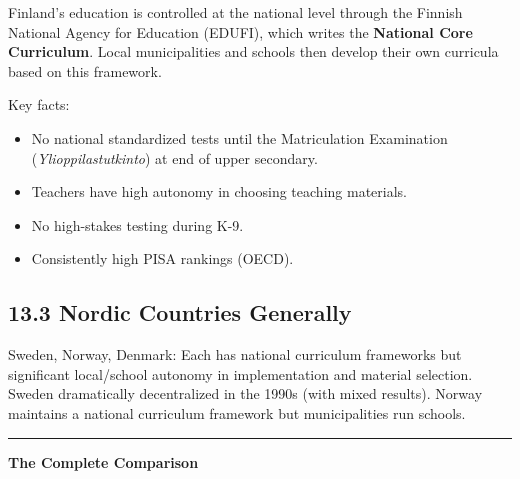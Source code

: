	Finland's education is controlled at the national level through the Finnish National Agency for Education (EDUFI), which writes the \textbf{National Core Curriculum}. Local municipalities and schools then develop their own curricula based on this framework.

	Key facts:
	\begin{itemize}
		\item No national standardized tests until the Matriculation Examination (\textit{Ylioppilastutkinto}) at end of upper secondary.
		\item Teachers have high autonomy in choosing teaching materials.
		\item No high-stakes testing during K-9.
		\item Consistently high PISA rankings (OECD).
	\end{itemize}

	\subsection{13.3 Nordic Countries Generally}

	Sweden, Norway, Denmark: Each has national curriculum frameworks but significant local/school autonomy in implementation and material selection. Sweden dramatically decentralized in the 1990s (with mixed results). Norway maintains a national curriculum framework but municipalities run schools.


\vspace{1em}
\noindent\textcolor{Rule}{\rule{\linewidth}{0.4pt}}
\vspace{0.5em}

{\centering\sffamily\bfseries\normalsize\color{Accent}The Complete Comparison\par}
\vspace{0.6em}

